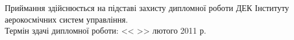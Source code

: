 Приймання здійснюється на підставі захисту дипломної роботи ДЕК Інституту аерокосмічних систем управління.\\

Термін здачі дипломної роботи: <<   >> лютого 2011 р.




% 
% 
% 
% 
